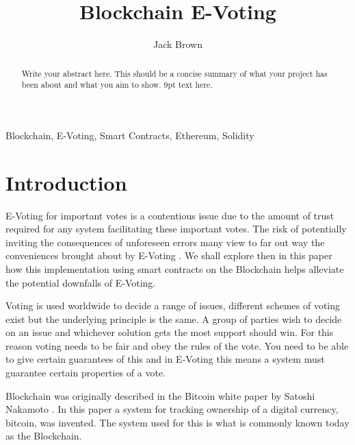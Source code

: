 \documentclass{entcs}
\begin{document}
\begin{frontmatter}

\title{Blockchain E-Voting}
\author{Jack Brown}
  \address{School of Computing Science, Newcastle University, UK} 

\begin{abstract} 
Write your abstract here. This should be a concise summary of what your project has been about and what you aim to show. 9pt text here.
\end{abstract}

\begin{keyword}
Blockchain, E-Voting, Smart Contracts, Ethereum, Solidity
\end{keyword}
\end{frontmatter}


\section{Introduction}

E-Voting for important votes is a contentious issue due to the amount of trust required for any system facilitating these important votes. The risk of potentially inviting the consequences of unforeseen errors many view to far out way the conveniences brought about by E-Voting \cite{lauer2004risk}. We shall explore then in this paper how this implementation using smart contracts on the Blockchain helps alleviate the potential downfalls of E-Voting.

Voting is used worldwide to decide a range of issues, different schemes of voting exist but the underlying principle is the same. A group of parties wish to decide on an issue and whichever solution gets the most support should win. For this reason voting needs to be fair and obey the rules of the vote. You need to be able to give certain guarantees of this and in E-Voting this means a system must guarantee certain properties of a vote.

Blockchain was originally described in the Bitcoin white paper by Satoshi Nakamoto \cite{BTCWhitepaper}. In this paper a system for tracking ownership of a digital currency, bitcoin, was invented. The system used for this is what is commonly known today as the Blockchain.
\end{document}
